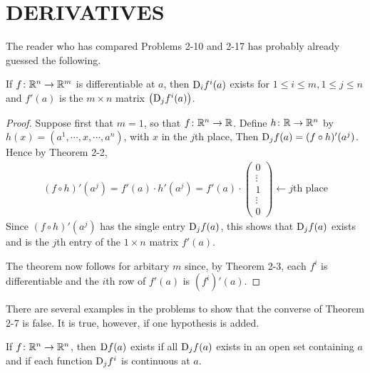 \clearpage
\section[\textsc{derivatives}]{DERIVATIVES}
The reader who has compared Problems 2-10 and 2-17 has
probably already guessed the following.

\begin{theorem}
    If $f\colon{}\mathbb{R}^n\to \mathbb{R}^m$ is differentiable at $a$, then $\mathrm{D}_if^i(a)$ exists for
    $1\le i \le m, 1\le j\le n$ and $f'(a)$ is the $m\times n$ matrix $\left(\mathrm{D}_jf^i(a)\right)$.
\end{theorem}

\begin{proof}
    Suppose first that $m=1$, so that $f\colon{}\mathbb{R}^n\to \mathbb{R}$. Define $h\colon{}\mathbb{R}\to \mathbb{R}^n$ by 
    $h(x) = \left(a^1, \cdots, x, \cdots, a^n\right)$, with $x$ in the $j$th place, Then 
    $\mathrm{D}_jf(a) = (f\circ h)'(a^j)$. Hence by Theorem 2-2,
    \begin{align*}
        (f\circ h)'(a^j) 
        = f'(a)\cdot h'(a^j) 
        = f'(a) \cdot \left(\begin{matrix}
            0 \\ \vdots \\ 1 \\ \vdots \\ 0
        \end{matrix}\right)
        \leftarrow j\text{th place}
    \end{align*} 
    Since $(f\circ h)'(a^j)$ has the single entry $\mathrm{D}_jf(a)$, this shows that $\mathrm{D}_jf(a)$ exists and is the 
    $j$th entry of the $1\times n$ matrix $f'(a)$.

    The theorem now follows for arbitary $m$ since, by Theorem 2-3, each $f^i$ is differentiable and the 
    $i$th row of $f'(a)$ is $(f^i)'(a)$.
\end{proof}

There are several examples in the problems to show that the
converse of Theorem 2-7 is false. It is true, however, if one
hypothesis is added.

\begin{theorem}
    If $f\colon{}\mathbb{R}^n\to \mathbb{R}^n$, then $\mathrm{D}f(a)$ exists if all $\mathrm{D}_jf(a)$ exists in an open set containing 
    $a$ and if each function $\mathrm{D}_jf^i$ is continuous at $a$.
\end{theorem}

